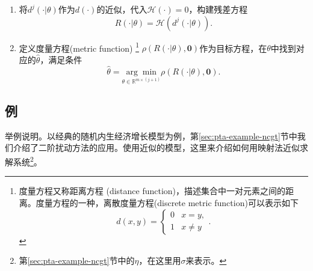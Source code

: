 \begin{algorithm}[映射法的基本算法]
\begin{enumerate}
    \item 将$d^{j}(\cdot | \theta)$作为$d(\cdot)$的近似，代入$\mathcal{H}(\cdot) = 0$，构建残差方程
    \begin{equation*}
      R(\cdot | \theta) = \mathcal{H} \left(d^j ( \cdot | \theta) \right).
    \end{equation*}
    \item 定义度量方程(metric function)
    \footnote{度量方程又称距离方程 (distance function)，描述集合中一对元素之间的距离。度量方程的一种，离散度量方程(discrete metric function)可以表示如下\begin{equation*}
    d(x,y) =
    \begin{cases}
      0 & x=y, \\
      1 & x \neq y
    \end{cases}.
    \end{equation*}    }
      $\rho \left(R(\cdot | \theta), \bm{0} \right)$作为目标方程，在$\theta$中找到对应的$\hat{\theta}$，满足条件
    \begin{equation*}
      \hat{\theta} = \underset{\theta \in \mathbb{R}^{m \times (j+1)}}{\arg \min} \rho \left(R(\cdot | \theta), \bm{0} \right).
    \end{equation*}
    \end{enumerate}
\end{algorithm}

\subsection{例}
\label{sec:pj-example-ncgt}
举例说明。以经典的随机内生经济增长模型为例，第\ref{sec:pta-example-ncgt}节中我们介绍了二阶扰动方法的应用。使用近似的模型，这里来介绍如何用映射法近似求解系统\footnote{第\ref{sec:pta-example-ncgt}节中的$\eta$，在这里用$\sigma$来表示。}。

